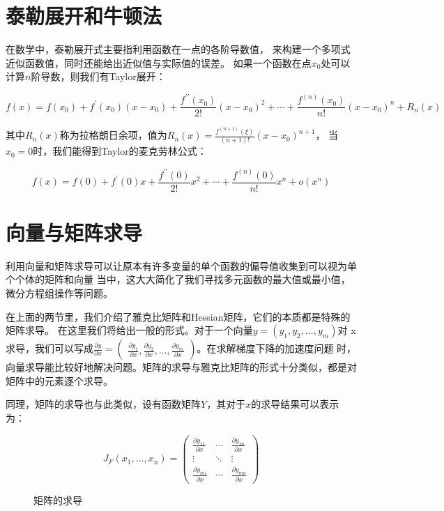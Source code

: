 \section{泰勒展开和牛顿法}
在数学中，泰勒展开式主要指利用函数在一点的各阶导数值，
来构建一个多项式近似函数值，同时还能给出近似值与实际值的误差。
如果一个函数在点$x_0$处可以计算$n$阶导数，则我们有Taylor展开：

\begin{equation*}
	f(x)=f\left(x_{0}\right)+f^{\prime}\left(x_{0}\right)\left(x-x_{0}\right)+\frac{f^{\prime \prime}\left(x_{0}\right)}{2 !}\left(x-x_{0}\right)^{2}+\cdots+\frac{f^{(n)}\left(x_{0}\right)}{n !}\left(x-x_{0}\right)^{n}+R_{n}(x)
\end{equation*}

其中$R_n(x)$称为拉格朗日余项，值为$R_{n}(x)=\frac{f^{(n+1)}(\xi)}{(n+1) !}\left(x-x_{0}\right)^{n+1}$，
当$x_0=0$时，我们能得到Taylor的麦克劳林公式：

\begin{equation*}
	f(x)=f(0)+f^{\prime}(0) x+\frac{f^{\prime \prime}(0)}{2 !} x^{2}+\cdots+\frac{f^{(n)}(0)}{n !} x^{n}+o\left(x^{n}\right)
\end{equation*}


\section{向量与矩阵求导}

利用向量和矩阵求导可以让原本有许多变量的单个函数的偏导值收集到可以视为单个个体的矩阵和向量
当中，这大大简化了我们寻找多元函数的最大值或最小值，微分方程组操作等问题。

在上面的两节里，我们介绍了雅克比矩阵和Hessian矩阵，它们的本质都是特殊的矩阵求导。
在这里我们将给出一般的形式。对于一个向量$y=(y_{1},y_{2},...,y_{m})$对
x求导，我们可以写成$\frac{\partial y}{\partial x}=\left( \begin{array}{ccc}{\frac{\partial y_{1}}{\partial x},\frac{\partial y_{2}}{\partial x},
...,\frac{\partial y_{m}}{\partial x}}\end{array}\right)$。在求解梯度下降的加速度问题
时，向量求导能比较好地解决问题。矩阵的求导与雅克比矩阵的形式十分类似，都是对矩阵中的元素逐个求导。

同理，矩阵的求导也与此类似，设有函数矩阵$Y$，其对于$x$的求导结果可以表示为：

\begin{figure}[!ht]
	\begin{equation}
		J_F(x_1,...,x_n)=
		\left( \begin{matrix}
			\frac{\partial y_{11}}{\partial x} & \cdots & \frac{\partial y_{1n}}{\partial x}\\
			\vdots & \ddots & \vdots\\
			\frac{\partial y_{m1}}{\partial x} & \cdots & \frac{\partial y_{mn}}{\partial x}
			\end{matrix}
			\right )
	\end{equation}
	\caption{矩阵的求导}
\end{figure}


